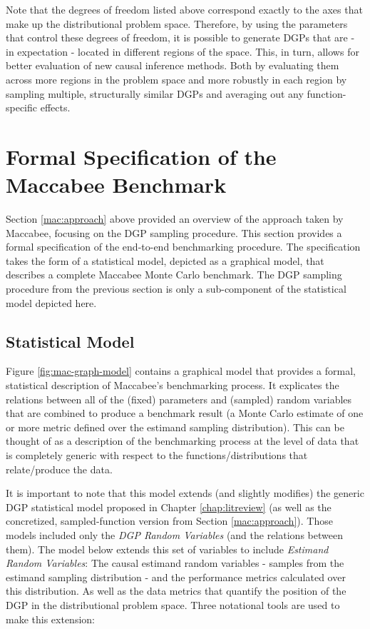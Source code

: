 \documentclass[../main.tex]{subfiles}
\begin{document}
\vspace{\baselineskip}

Note that the degrees of freedom listed above correspond exactly to the axes that make up the distributional problem space. Therefore, by using the parameters that control these degrees of freedom, it is possible to generate DGPs that are - in expectation - located in different regions of the space. This, in turn, allows for better evaluation of new causal inference methods. Both by evaluating them across more regions in the problem space and more robustly in each region by sampling multiple, structurally similar DGPs and averaging out any function-specific effects.

\section{Formal Specification of the Maccabee Benchmark}
\label{mac:formalspec}

Section \ref{mac:approach} above provided an overview of the approach taken by Maccabee, focusing on the DGP sampling procedure. This section provides a formal specification of the end-to-end benchmarking procedure. The specification takes the form of a statistical model, depicted as a graphical model, that describes a complete Maccabee Monte Carlo benchmark. The DGP sampling procedure from the previous section is only a sub-component of the statistical model depicted here.

\subsection{Statistical Model}

Figure \ref{fig:mac-graph-model} contains a graphical model that provides a formal, statistical description of Maccabee's benchmarking process. It explicates the relations between all of the (fixed) parameters and (sampled) random variables that are combined to produce a benchmark result (a Monte Carlo estimate of one or more metric defined over the estimand sampling distribution). This can be thought of as a description of the benchmarking process at the level of data that is completely generic with respect to the functions/distributions that relate/produce the data.

\vspace{\baselineskip}

It is important to note that this model extends (and slightly modifies) the generic DGP statistical model proposed in Chapter \ref{chap:litreview} (as well as the concretized, sampled-function version from Section \ref{mac:approach}). Those models included only the \textit{DGP Random Variables} (and the relations between them). The model below extends this set of variables to include \textit{Estimand Random Variables}: The causal estimand random variables - samples from the estimand sampling distribution - and the performance metrics calculated over this distribution. As well as the data metrics that quantify the position of the DGP in the distributional problem space. Three notational tools are used to make this extension:
\end{document}
